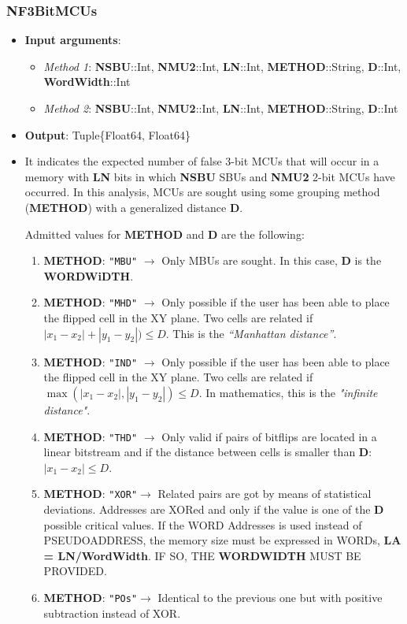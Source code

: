 \subsubsection*{NF3BitMCUs}\label{Fun:NF3BitMCUs}
%
\begin{itemize}
	\item \textbf{Input arguments}: 
	\begin{itemize}
		\item \textit{Method 1}: \textbf{NSBU}::Int, \textbf{NMU2}::Int, \textbf{LN}::Int, \textbf{METHOD}::String, \textbf{D}::Int, \\ \textbf{WordWidth}::Int
		\item \textit{Method 2}: \textbf{NSBU}::Int, \textbf{NMU2}::Int, \textbf{LN}::Int, \textbf{METHOD}::String, \textbf{D}::Int
	\end{itemize}
	\item \textbf{Output}: Tuple\{Float64, Float64\}
	\item     It indicates the expected number of false 3-bit MCUs that will occur 	in a memory with \textbf{LN} bits in which \textbf{NSBU} SBUs and \textbf{NMU2} 2-bit MCUs have occurred. 	In this analysis, MCUs are sought using some grouping method (\textbf{METHOD}) with a generalized 
	distance \textbf{D}.
	
	Admitted values for \textbf{METHOD} and \textbf{D} are the following:
	
	\begin{enumerate}
	\item \textbf{METHOD}: \texttt{"MBU"} \(\rightarrow\) Only MBUs are sought. In this case, \textbf{D} is the \textbf{WORDWiDTH}.
	\item \textbf{METHOD}: \texttt{"MHD"} \(\rightarrow\)  Only possible if the user has been able to place the flipped	cell in the XY plane. Two cells are related if \(\left|x_1-x_2\right|+ \left|y_1-y_2\right|) \le D\). This  is the \textit{``Manhattan distance''}.
	\item \textbf{METHOD}: \texttt{"IND"} \(\rightarrow\)  Only possible if the user has been able to place the flipped	cell in the XY plane. Two cells are related if \(\max(\left|x_1-x_2\right|, \left|y_1-y_2\right|) \le D\). In mathematics, this is the \textit{"infinite distance"}.
	\item \textbf{METHOD}: \texttt{"THD"} \(\rightarrow\)  Only valid if pairs of bitflips are located in a linear bitstream and if the
	distance between cells is smaller than \textbf{D}: \(\left|x_1-x_2\right| \le D\).
	\item \textbf{METHOD}: \texttt{"XOR"}\(\rightarrow\)  Related pairs are got by means of statistical deviations. Addresses are XORed 
	and only if the value is one of the \textbf{D} possible critical values. If the WORD Addresses  
	is used instead of PSEUDOADDRESS, the memory size must be expressed in WORDs, \textbf{LA = LN/WordWidth}.
	IF SO, THE \textbf{WORDWIDTH} MUST BE PROVIDED.
	\item \textbf{METHOD}: \texttt{"POs"}\(\rightarrow\)  Identical to the previous one but with positive subtraction instead of XOR.
\end{enumerate}
	

\end{itemize}
